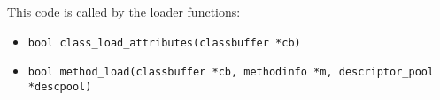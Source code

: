 \documentclass[a4paper, 10pt, titlepage]{scrartcl} %
\begin{document}
This code is called by the loader functions:
\begin{itemize}
 \item \begin{scriptsize}\verb|bool|\hspace{0.0pt}\verb| |\hspace{0.0pt}\verb|class_load_attributes|\hspace{0.0pt}\verb|(|\hspace{0.0pt}\verb|classbuffer|\hspace{0.0pt}\verb| |\hspace{0.0pt}\verb||\hspace{0.0pt}\verb|*|\hspace{0.0pt}\verb|cb|\hspace{0.0pt}\verb|)|\hspace{0.0pt}\verb||\end{scriptsize}
 \item \begin{scriptsize}\verb|bool|\hspace{0.0pt}\verb| |\hspace{0.0pt}\verb|method_load|\hspace{0.0pt}\verb|(|\hspace{0.0pt}\verb|classbuffer|\hspace{0.0pt}\verb| |\hspace{0.0pt}\verb||\hspace{0.0pt}\verb|*|\hspace{0.0pt}\verb|cb|\hspace{0.0pt}\verb|,|\hspace{0.0pt}\verb||\hspace{0.0pt}\verb| |\hspace{0.0pt}\verb|methodinfo|\hspace{0.0pt}\verb| |\hspace{0.0pt}\verb||\hspace{0.0pt}\verb|*|\hspace{0.0pt}\verb|m|\hspace{0.0pt}\verb|,|\hspace{0.0pt}\verb||\hspace{0.0pt}\verb| |\hspace{0.0pt}\verb|descriptor_pool|\hspace{0.0pt}\verb| |\hspace{0.0pt}\verb||\hspace{0.0pt}\verb|*|\hspace{0.0pt}\verb|descpool|\hspace{0.0pt}\verb|)|\hspace{0.0pt}\verb||\end{scriptsize}

\end{itemize}
\end{document}
